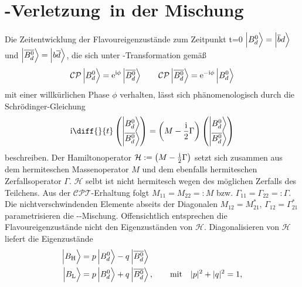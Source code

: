 \section[\CP-Verletzung in der Mischung]{\boldmath\CP-Verletzung\ \unboldmath in der Mischung}
Die Zeitentwicklung der Flavoureigenzustände zum Zeitpunkt t=0 $\Ket{\text{\Bd}\vphantom{\text{\Bdbar}}} = \Ket{\overline{b}d\vphantom{\text{\Bdbar}}}$ und $\Ket{\text{\Bdbar}} = \Ket{b\overline{d}\vphantom{\text{\Bdbar}}}$, die sich unter \CP-Transformation gemäß
\begin{align}
\text{\CP}\Ket{\text{\Bd}\vphantom{\text{\Bdbar}}} = \e^{\im\phi}\Ket{\text{\Bdbar}} \qquad \text{\CP}\Ket{\text{\Bdbar}} = \e^{-\im\phi}\Ket{\text{\Bd}\vphantom{\text{\Bdbar}}}
\end{align} 
mit einer willkürlichen Phase $\phi$ verhalten, lässt sich phänomenologisch durch die Schrödinger-Gleichung
\begin{align}
\im \diff{}{t}\begin{pmatrix} \Ket{\text{\Bd}\vphantom{\text{\Bdbar}}} \\ \Ket{\text{\Bdbar}} \end{pmatrix} = \left(M - \frac{\im}{2} \Gamma\right) \begin{pmatrix} \Ket{\text{\Bd}\vphantom{\text{\Bdbar}}} \\ \Ket{\text{\Bdbar}} \end{pmatrix}
\end{align}
beschreiben. Der Hamiltonoperator $\mathcal{H}:=\left(M - \frac{\mathrm{i}}{2} \Gamma\right)$ setzt sich zusammen aus dem hermiteschen Massenoperator $M$ und dem ebenfalls hermiteschen Zerfallsoperator $\Gamma$. $\mathcal{H}$ selbt ist nicht hermitesch wegen des möglichen Zerfalls des Teilchens. Aus der $\mathcal{CPT}$-Erhaltung folgt $M_{11}=M_{22}=:M$ bzw. $\Gamma_{11}=\Gamma_{22}=:\Gamma$. Die nichtverschwindenden Elemente abseits der Diagonalen $M_{12}=M_{21}^*$, $\Gamma_{12}=\Gamma_{21}^*$ parametrisieren die \Bd-\Bdbar-Mischung. Offensichtlich entsprechen die Flavoureigenzustände nicht den Eigenzuständen von $\mathcal{H}$. Diagonalisieren von $\mathcal{H}$ liefert die Eigenzustände
\begin{align}
\Ket{B_{\text{H}}\vphantom{\text{\Bdbar}}} &= p \Ket{\text{\Bd}\vphantom{\text{\Bdbar}}} - q \Ket{\text{\Bdbar}} \label{eq:b_heavy}\\ 
\Ket{B_{\text{L}}\vphantom{\text{\Bdbar}}} &= p \Ket{\text{\Bd}\vphantom{\text{\Bdbar}}} + q \Ket{\text{\Bdbar}}, \qquad \text{mit} \quad |p|^2 + |q|^2 = 1, \label{eq:b_light}
\end{align}
